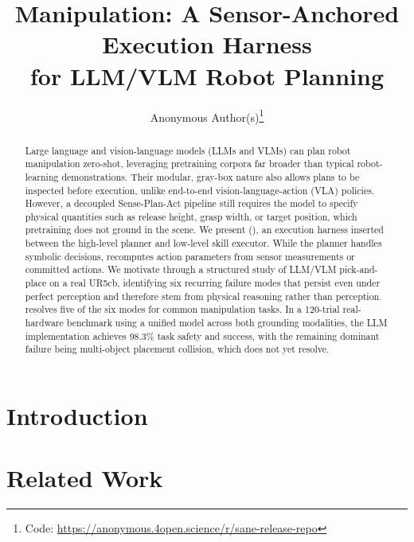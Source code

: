 \documentclass[letterpaper, 10 pt, conference]{ieeeconf}
\begin{document}
\title{\LARGE \bf \harness{} Manipulation: A Sensor-Anchored Execution Harness\\for LLM/VLM Robot Planning}

\author{Anonymous Author(s)\thanks{Code: \url{https://anonymous.4open.science/r/sane-release-repo}}}


\maketitle

\begin{abstract}
Large language and vision-language models (LLMs and VLMs) can plan robot manipulation zero-shot, leveraging pretraining corpora far broader than typical robot-learning demonstrations. Their modular, gray-box nature also allows plans to be inspected before execution, unlike end-to-end vision-language-action (VLA) policies. However, a decoupled Sense-Plan-Act pipeline still requires the model to specify physical quantities such as release height, grasp width, or target position, which pretraining does not ground in the scene. We present \harness{} (\harnesslong{}), an execution harness inserted between the high-level planner and low-level skill executor. While the planner handles symbolic decisions, \harness{} recomputes action parameters from sensor measurements or committed actions. We motivate \harness{} through a structured study of LLM/VLM pick-and-place on a real UR5cb, identifying six recurring failure modes that persist even under perfect perception and therefore stem from physical reasoning rather than perception. \harness{} resolves five of the six modes for common manipulation tasks. In a 120-trial real-hardware benchmark using a unified model across both grounding modalities, the LLM implementation achieves 98.3\% task safety and success, with the remaining dominant failure being multi-object placement collision, which \harness{} does not yet resolve.
\end{abstract}

\section{Introduction}
\label{sec:introduction}


\section{Related Work}
\label{sec:related-work}

\end{document}

